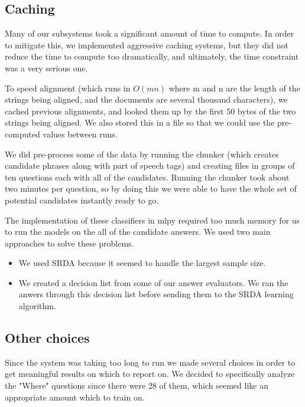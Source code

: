 \documentclass{article}
\begin{document}
\subsection{Caching}

Many of our subsystems took a significant amount of time to compute.  In order
to mitigate this, we implemented aggressive caching systems, but they did not
reduce the time to compute too dramatically, and ultimately, the time constraint
was a very serious one.

To speed alignment (which runs in $O(mn)$ where m and n are the length of the strings being aligned, and the documents are several thousand characters), we cached previous alignments, and looked them up by the first 50 bytes of the two strings being aligned.  We also stored this in a file so that we could use the pre-computed values between runs.

We did pre-process some of the data by running the chunker (which creates
candidate phrases along with part of speech tags) and creating files in
groups of ten questions each with all of the candidates. Running the chunker
took about two minutes per question, so by doing this we were able to have
the whole set of potential candidates instantly ready to go.

The implementation of these classifiers in mlpy required too much memory for
us to run the models on the all of the candidate answers. We used two main approaches
to solve these problems.
\begin{itemize}
\item We used SRDA because it seemed to handle the largest sample size.
\item We created a decision list from some of our answer evaluators. We ran the anwers
through this decision list before sending them to the SRDA learning algorithm.
\end{itemize}

\subsection{Other choices}
Since the system was taking too long to run we made several choices in order
to get meaningful results on which to report on. We decided to specifically analyze
the "Where" questions since there were 28 of them, which seemed like an appropriate
amount which to train on.
\end{document}
